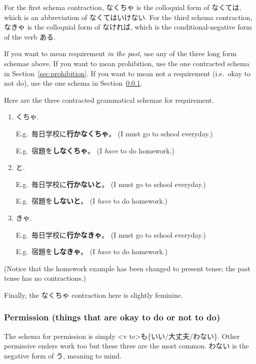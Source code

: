 \documentclass[../nihongo-gakushuu-kyouzai.tex]{subfiles}
\begin{document}
For the first schema contraction, なくちゃ is the colloquial form of なくては, which is an abbreviation of なくてはいけない. For the third schema contraction, なきゃ is the colloquial form of なければ, which is the conditional-negative form of the verb ある. 

 If you want to mean requirement \emph{in the past}, use any of the three long form schemae above. If you want to mean prohibition, use the one contracted schema in Section~\ref{sec:prohibition}. If you want to mean not a requirement (i.e.\ okay to not do), use the one schema in Section~\ref{sec:permission}.

Here are the three contracted grammatical schemae for requirement.
\begin{enumerate}[label=\arabic*.]
    \item <v negative fragment ending in な>くちゃ.

    E.g.\ 毎日学校に\textbf{行かなくちゃ}。 (I must go to school everyday.)

    E.g.\ 宿題を\textbf{しなくちゃ}。 (I \emph{have} to do homework.)
    \item <v negative>と.

    E.g.\ 毎日学校に\textbf{行かないと}。 (I must go to school everyday.)

    E.g.\ 宿題を\textbf{しないと}。 (I \emph{have} to do homework.)

    \item <v negative fragment ending in な>きゃ.

    E.g.\ 毎日学校に\textbf{行かなきゃ}。 (I must go to school everyday.)

    E.g.\ 宿題を\textbf{しなきゃ}。 (I \emph{have} to do homework.)
\end{enumerate}
(Notice that the homework example has been changed to present tense; the past tense has no contractions.)

Finally, the なくちゃ contraction here is slightly feminine.

\subsubsection{Permission (things that are okay to do or not to do)} \label{sec:permission}
The schema for permission is simply <v te>も\{いい/大丈夫/わない\}. Other permissive enders work too but these three are the most common. わない is the negative form of う, meaning to mind.
\end{document}
